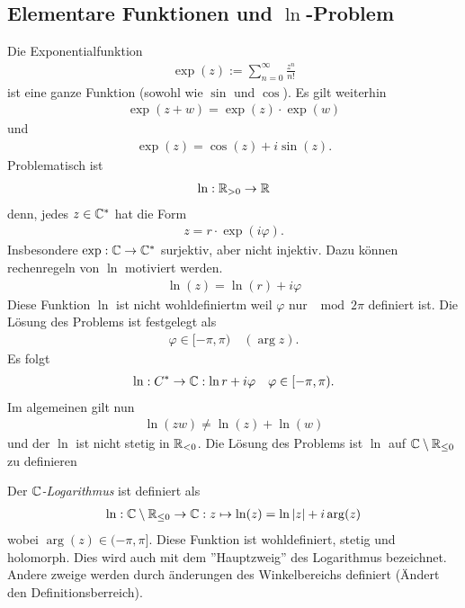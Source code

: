 \documentclass[ngerman]{report}
\begin{document}
\subsection{Elementare Funktionen und $\ln$-Problem}
Die Exponentialfunktion
\begin{align*}
    \exp(z) := \sum_{n=0}^\infty \frac{z^n}{n!} 
\end{align*}
ist eine ganze Funktion (sowohl wie $\sin$ und $\cos$). Es gilt weiterhin
\begin{align*}
    \exp(z+w) = \exp(z)\cdot \exp(w)
\end{align*}
und
\begin{align*}
    \exp(z) = \cos(z) + i\sin(z).
\end{align*}
Problematisch ist 
\begin{align*}
    \ln: \mathbb{R}_{>0}\to \mathbb{R}
\end{align*}
denn, jedes $z\in\mathbb{C}^\ast$ hat die Form 
\begin{align*}
    z = r\cdot \exp(i\varphi).
\end{align*}
Insbesondere $\exp:\mathbb{C}\to\mathbb{C}^\ast$ surjektiv, aber nicht injektiv. Dazu können rechenregeln von $\ln$ motiviert werden. 
\begin{align*}
    \ln(z) = \ln(r) + i\varphi
\end{align*}
Diese Funktion $\ln$ ist nicht wohldefiniertm weil $\varphi$ nur $\mod 2\pi$ definiert ist. Die Lösung des Problems ist festgelegt als 
\begin{align*}
    \varphi \in [-\pi,\pi) \quad (\arg z).
\end{align*}
Es folgt
\begin{align*}
    \ln:C^\ast \to \mathbb{C}: \ln r + i\varphi \quad \varphi \in [-\pi,\pi).
\end{align*}
Im algemeinen gilt nun
\begin{align*}
    \ln(z w) \neq \ln(z) + \ln(w)
\end{align*}
und der $\ln$ ist nicht stetig in $\mathbb{R}_{<0}$. Die Lösung des Problems ist $\ln$ auf $\mathbb{C}\setminus\mathbb{R}_{\leq 0}$ zu definieren
\begin{definition}[$\C$-Logarithmus]
    Der \emph{$\C$-Logarithmus} ist definiert als
    \begin{align*}
        \ln:\mathbb{C}\setminus\mathbb{R}_{\leq 0}\to \mathbb{C}: z\mapsto \ln(z) = \ln\left|z\right| + i\arg(z)
    \end{align*}
    wobei $\arg(z)\in (-\pi,\pi]$. Diese Funktion ist wohldefiniert, stetig und holomorph. Dies wird auch mit dem ''Hauptzweig'' des Logarithmus bezeichnet. Andere zweige werden durch änderungen des Winkelbereichs definiert (Ändert den Definitionsberreich).
\end{definition}
\end{document}
